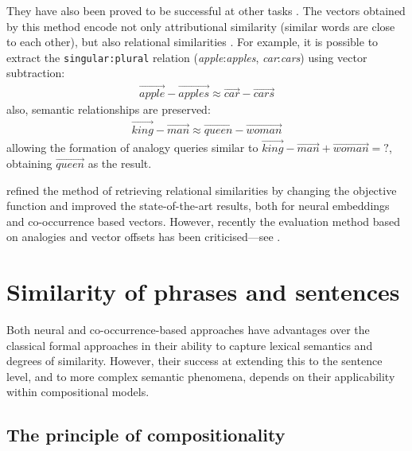 They have also been proved to be successful at other tasks \cite{mikolov2013linguistic}. The vectors obtained by this method encode not only attributional similarity (similar words are close to each other), but also relational similarities \cite{Turney:2010:FMV:1861751.1861756}. For example, it is possible to extract the \texttt{singular:plural} relation (\textit{apple}:\textit{apples}, \textit{car}:\textit{cars}) using vector subtraction:
%
\begin{align*}
  \overrightarrow{\mathit{apple}} - \overrightarrow{\mathit{apples}}
  \approx
  \overrightarrow{\mathit{car}} - \overrightarrow{\mathit{cars}}
\end{align*}
%
also, semantic relationships are preserved:
%
\begin{align*}
  \overrightarrow{\mathit{king}} - \overrightarrow{\mathit{man}}
  \approx
  \overrightarrow{\mathit{queen}} - \overrightarrow{\mathit{woman}}
\end{align*}
%
allowing the formation of analogy queries similar to
$\overrightarrow{\mathit{king}} - \overrightarrow{\mathit{man}} +
\overrightarrow{\mathit{woman}} = \mathtt{?}$, obtaining
$\overrightarrow{\mathit{queen}}$ as the
result.

 refined the method of retrieving relational similarities by changing the objective function and improved the state-of-the-art results, both for neural embeddings and co-occurrence based vectors. However, recently the evaluation method based on analogies and vector offsets has been criticised---see .

\section{Similarity of phrases and sentences}
\label{sec:similarity-compounds}

Both neural and co-occurrence-based approaches have advantages over
the classical formal approaches in their ability to capture lexical
semantics and degrees of similarity. However, their success at extending this to the sentence level, and to more complex semantic phenomena, depends on their applicability within compositional models.

\subsection{The principle of compositionality}
\label{sec:formal-semantics}

